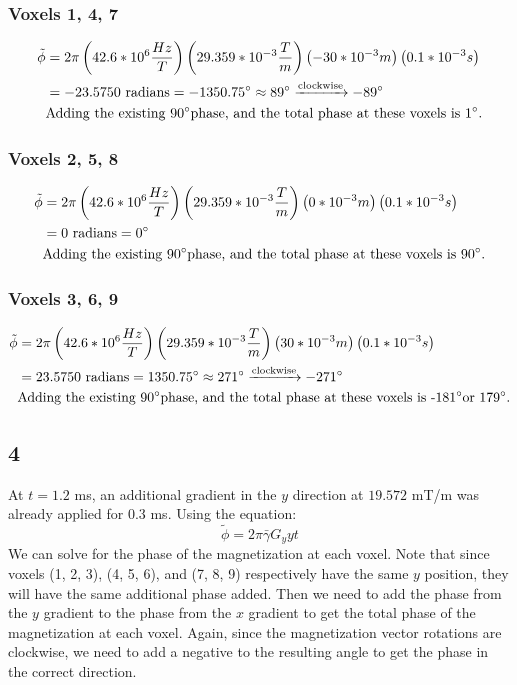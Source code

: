 \documentclass{article}
\begin{document}
\subsubsection*{Voxels 1, 4, 7}
\begin{align*}
    \tilde{\phi} &= 
    2\pi \left(42.6 * 10^{6} \frac{Hz}{T}\right)
    \left(29.359 * 10^{-3} \frac{T}{m} \right)
    \left(-30 * 10^{-3} m \right)
    \left(0.1 * 10^{-3} s \right) \\
    &= -23.5750 \textrm{ radians} = -1350.75\degree \approx 89\degree \xrightarrow{\text{clockwise}} -89\degree \\
    &\textrm{Adding the existing 90\degree phase, and the total phase at these voxels is 1\degree.}
\end{align*}
\subsubsection*{Voxels 2, 5, 8}
\begin{align*}
    \tilde{\phi} &= 
    2\pi \left(42.6 * 10^{6} \frac{Hz}{T}\right)
    \left(29.359 * 10^{-3} \frac{T}{m} \right)
    \left(0 * 10^{-3} m \right)
    \left(0.1 * 10^{-3} s \right) \\
    &= 0 \textrm{ radians} = 0\degree \\
    &\textrm{Adding the existing 90\degree phase, and the total phase at these voxels is 90\degree.}
\end{align*}
\subsubsection*{Voxels 3, 6, 9}
\begin{align*}
    \tilde{\phi} &= 
    2\pi \left(42.6 * 10^{6} \frac{Hz}{T}\right)
    \left(29.359 * 10^{-3} \frac{T}{m} \right)
    \left(30 * 10^{-3} m \right)
    \left(0.1 * 10^{-3} s \right) \\
    &= 23.5750 \textrm{ radians} = 1350.75\degree \approx 271\degree \xrightarrow{\text{clockwise}} -271\degree \\
    &\textrm{Adding the existing 90\degree phase, and the total phase at these voxels is -181\degree or 179\degree.}
\end{align*}

\subsection*{4}
At $t = 1.2$ ms, an additional gradient in the $y$ direction at $19.572$ mT/m was already applied for $0.3$ ms. Using
the equation: \[ \tilde{\phi} = 2\pi \bar{\gamma}G_{y}yt \]
We can solve for the phase of the magnetization at each voxel. Note that since
voxels (1, 2, 3), (4, 5, 6), and (7, 8, 9) respectively have the
same $y$ position, they will have the same additional phase added. Then we need to add the
phase from the $y$ gradient to the phase from the $x$ gradient to get the total
phase of the magnetization at each voxel. Again, since the magnetization vector rotations are clockwise, we
need to add a negative to the resulting angle to get the phase in the correct direction.  
\end{document}
